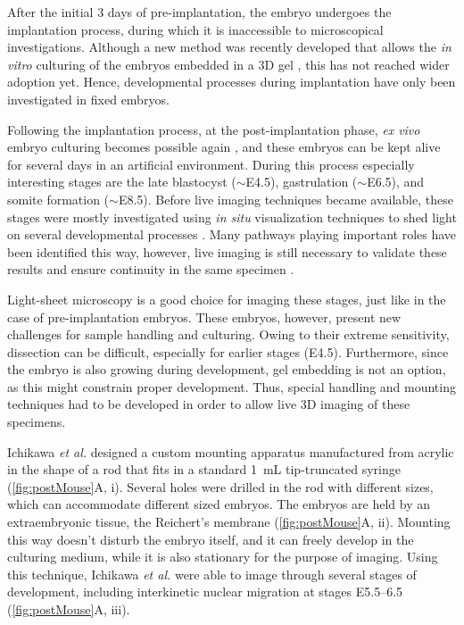     After the initial 3 days of pre-implantation, the embryo undergoes the implantation process, during which it is inaccessible to microscopical investigations. Although a new method was recently developed that allows the \textit{in vitro} culturing of the embryos embedded in a 3D gel \cite{panavaite_3d-geec:_2017}, this has not reached wider adoption yet. Hence, developmental processes during implantation have only been investigated in fixed embryos.
    
    Following the implantation process, at the post-implantation phase, \textit{ex vivo} embryo culturing becomes possible again \cite{hsu_vitro_1979, huang_effect_2001}, and these embryos can be kept alive for several days in an artificial environment. During this process especially interesting stages are the late blastocyst ($\sim$E4.5), gastrulation ($\sim$E6.5), and somite formation ($\sim$E8.5). Before live imaging techniques became available, these stages were mostly investigated using \textit{in situ} visualization techniques to shed light on several developmental processes \cite{nowotschin_cellular_2010}. Many pathways playing important roles have been identified this way, however, live imaging is still necessary to validate these results and ensure continuity in the same specimen \cite{garcia_live_2011}.

    Light-sheet microscopy is a good choice for imaging these stages, just like in the case of pre-implantation embryos. These embryos, however, present new challenges for sample handling and culturing. Owing to their extreme sensitivity, dissection can be difficult, especially for earlier stages (E4.5). Furthermore, since the embryo is also growing during development, gel embedding is not an option, as this might constrain proper development. Thus, special handling and mounting techniques had to be developed in order to allow live 3D imaging of these specimens.

    Ichikawa \textit{et al.} \cite{ichikawa_live_2013} designed a custom mounting apparatus manufactured from acrylic in the shape of a rod that fits in a standard \SI{1}{mL} tip-truncated syringe (\autoref{fig:postMouse}A, i). Several holes were drilled in the rod with different sizes, which can accommodate different sized embryos. The embryos are held by an extraembryonic tissue, the Reichert's membrane (\autoref{fig:postMouse}A, ii). Mounting this way doesn't disturb the embryo itself, and it can freely develop in the culturing medium, while it is also stationary for the purpose of imaging. Using this technique, Ichikawa \textit{et al.} were able to image through several stages of development, including interkinetic nuclear migration at stages E5.5--6.5 (\autoref{fig:postMouse}A, iii).

